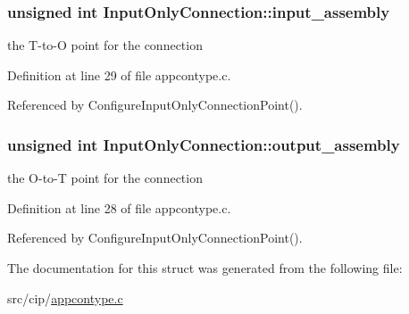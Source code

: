 \hypertarget{structInputOnlyConnection_ac507a28eae5d0a06c202480d2629a9bb}{
\subsubsection[{input\-\_\-assembly}]{\setlength{\rightskip}{0pt plus 5cm}unsigned int {\bf \-Input\-Only\-Connection\-::input\-\_\-assembly}}}\label{d7/dd8/structInputOnlyConnection_ac507a28eae5d0a06c202480d2629a9bb}
the \-T-\/to-\/\-O point for the connection 

\-Definition at line 29 of file appcontype.\-c.



\-Referenced by \-Configure\-Input\-Only\-Connection\-Point().

\hypertarget{structInputOnlyConnection_aa725637dd2ea13938840d84d2e449f7a}{
\subsubsection[{output\-\_\-assembly}]{\setlength{\rightskip}{0pt plus 5cm}unsigned int {\bf \-Input\-Only\-Connection\-::output\-\_\-assembly}}}\label{d7/dd8/structInputOnlyConnection_aa725637dd2ea13938840d84d2e449f7a}
the \-O-\/to-\/\-T point for the connection 

\-Definition at line 28 of file appcontype.\-c.



\-Referenced by \-Configure\-Input\-Only\-Connection\-Point().



\-The documentation for this struct was generated from the following file\-:\begin{DoxyCompactItemize}
\item 
src/cip/\hyperlink{appcontype_8c}{appcontype.\-c}\end{DoxyCompactItemize}
